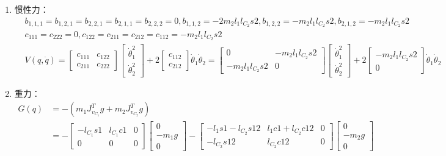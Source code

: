 \documentclass[
12pt, %
a4paper, 
oneside, %
headinclude,footinclude, %
]{scrartcl}
\begin{document}
{\begin{enumerate}
\begin{align*}
&= \begin{bmatrix} m_1l_{C_1}^2 + I_{zz1} + m_2(l_1^2 + l_{C_2}^2 + 2l_1 l_{C_2}c_2) + I_{zz2} & m_2(l_{C_2}^2 + l_1 l_{C_2}c2) + I_{zz2} \\ m_2(l_{C_2}^2 + l_1 l_{C_2}c2) + I_{zz2} & m_2 l_{C_2}^2 + I_{zz2} \end{bmatrix}
\end{align*}
\item 惯性力：
\begin{align*}
&b_{1,1,1} = b_{1,2,1} = b_{2,2,1} = b_{2,1,1} = b_{2,2,2} = 0, b_{1,1,2} = -2m_2 l_1 l_{C_2}s2, b_{1,2,2} = -m_2 l_1 l_{C_2}s2, b_{2,1,2} = -m_2 l_1 l_{C_2}s2 \\
&c_{111} = c_{222} = 0, c_{122} = c_{211} = c_{212} = c_{112} = -m_2 l_1 l_{C_2}s2 \\
&V(q, \dot{q}) = \begin{bmatrix} c_{111} & c_{122} \\ c_{211} & c_{222} \end{bmatrix} \begin{bmatrix} \dot{\theta}_1^2 \\ \dot{\theta}_2^2 \end{bmatrix} + 2\begin{bmatrix} c_{112} \\ c_{212} \end{bmatrix} \dot{\theta}_1\dot{\theta}_2 = \begin{bmatrix} 0 & -m_2 l_1 l_{C_2}s2 \\ -m_2 l_1 l_{C_2}s2 & 0 \end{bmatrix} \begin{bmatrix} \dot{\theta}_1^2 \\ \dot{\theta}_2^2 \end{bmatrix} + 2\begin{bmatrix} -m_2 l_1 l_{C_2}s2 \\ 0 \end{bmatrix} \dot{\theta}_1 \dot{\theta}_2
\end{align*}
\item 重力：
\begin{align*}
G(q) &= -(m_1 J_{v_{C_1}}^T g + m_2 J_{v_{C_2}}^T g) \\
&= -\begin{bmatrix} -l_{C_1}s1 & l_{C_1}c1 & 0 \\ 0 & 0 & 0 \end{bmatrix} \begin{bmatrix} 0 \\ -m_1 g \\ 0 \end{bmatrix} - \begin{bmatrix} -l_1 s1 - l_{C_2}s12 & l_1 c1 + l_{C_2}c12 & 0 \\ -l_{C_2}s12 & l_{C_2}c12 & 0 \end{bmatrix} \begin{bmatrix} 0 \\ -m_2 g \\ 0 \end{bmatrix} \\

\end{align*}
\end{enumerate}}
\end{document}
